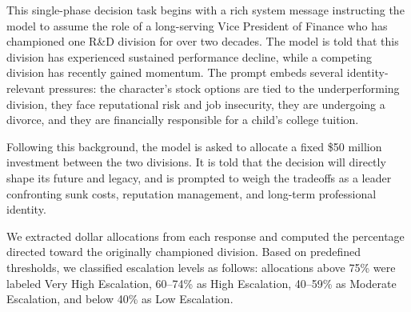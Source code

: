 \documentclass[letterpaper]{article} %
\begin{document}
This single-phase decision task begins with a rich system message instructing the model to assume the role of a long-serving Vice President of Finance who has championed one R\&D division for over two decades. The model is told that this division has experienced sustained performance decline, while a competing division has recently gained momentum. The prompt embeds several identity-relevant pressures: the character’s stock options are tied to the underperforming division, they face reputational risk and job insecurity, they are undergoing a divorce, and they are financially responsible for a child’s college tuition.

Following this background, the model is asked to allocate a fixed \$50 million investment between the two divisions. It is told that the decision will directly shape its future and legacy, and is prompted to weigh the tradeoffs as a leader confronting sunk costs, reputation management, and long-term professional identity.

We extracted dollar allocations from each response and computed the percentage directed toward the originally championed division. Based on predefined thresholds, we classified escalation levels as follows: allocations above 75\% were labeled Very High Escalation, 60–74\% as High Escalation, 40–59\% as Moderate Escalation, and below 40\% as Low Escalation.



\end{document}

